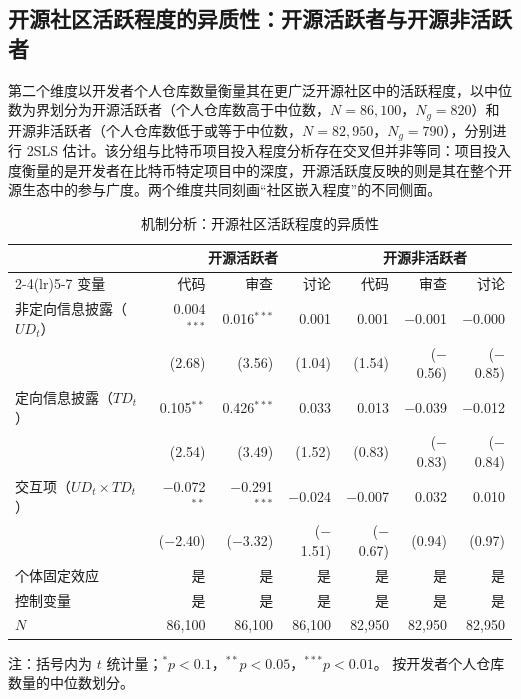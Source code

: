 \subsection{开源社区活跃程度的异质性：开源活跃者与开源非活跃者}

第二个维度以开发者个人仓库数量衡量其在更广泛开源社区中的活跃程度，以中位数为界划分为开源活跃者（个人仓库数高于中位数，$N = 86{,}100$，$N_g = 820$）和开源非活跃者（个人仓库数低于或等于中位数，$N = 82{,}950$，$N_g = 790$），分别进行 2SLS 估计。该分组与比特币项目投入程度分析存在交叉但并非等同：项目投入度衡量的是开发者在比特币特定项目中的深度，开源活跃度反映的则是其在整个开源生态中的参与广度。两个维度共同刻画“社区嵌入程度”的不同侧面。

\begin{table}[htbp]
    \centering
    \caption{机制分析：开源社区活跃程度的异质性}
    \label{tab:mechanism-active}
    \small
    \begin{tabularx}{\textwidth}{Xrrrrrr}
        \toprule
        & \multicolumn{3}{c}{开源活跃者}
        & \multicolumn{3}{c}{开源非活跃者} \\
        \cmidrule(lr){2-4}\cmidrule(lr){5-7}
        变量 & 代码 & 审查 & 讨论 & 代码 & 审查 & 讨论 \\
        \midrule
        非定向信息披露（$UD_t$）
            & 0.004$^{***}$ & 0.016$^{***}$ & 0.001
            & 0.001 & $-$0.001 & $-$0.000 \\
            & (2.68) & (3.56) & (1.04)
            & (1.54) & ($-$0.56) & ($-$0.85) \\[0.4em]
        定向信息披露（$TD_t$）
            & 0.105$^{**}$ & 0.426$^{***}$ & 0.033
            & 0.013 & $-$0.039 & $-$0.012 \\
            & (2.54) & (3.49) & (1.52)
            & (0.83) & ($-$0.83) & ($-$0.84) \\[0.4em]
        交互项（$UD_t \times TD_t$）
            & $-$0.072$^{**}$ & $-$0.291$^{***}$ & $-$0.024
            & $-$0.007 & 0.032 & 0.010 \\
            & ($-$2.40) & ($-$3.32) & ($-$1.51)
            & ($-$0.67) & (0.94) & (0.97) \\[0.4em]
        \midrule
        个体固定效应 & 是 & 是 & 是 & 是 & 是 & 是 \\
        控制变量 & 是 & 是 & 是 & 是 & 是 & 是 \\
        $N$ & 86,100 & 86,100 & 86,100 & 82,950 & 82,950 & 82,950 \\
        \bottomrule
    \end{tabularx}
    \begin{minipage}{\textwidth}
        \vspace{0.3em}
        \footnotesize 注：括号内为 $t$ 统计量；$^{*}p<0.1$，$^{**}p<0.05$，$^{***}p<0.01$。
        按开发者个人仓库数量的中位数划分。
    \end{minipage}
\end{table}

